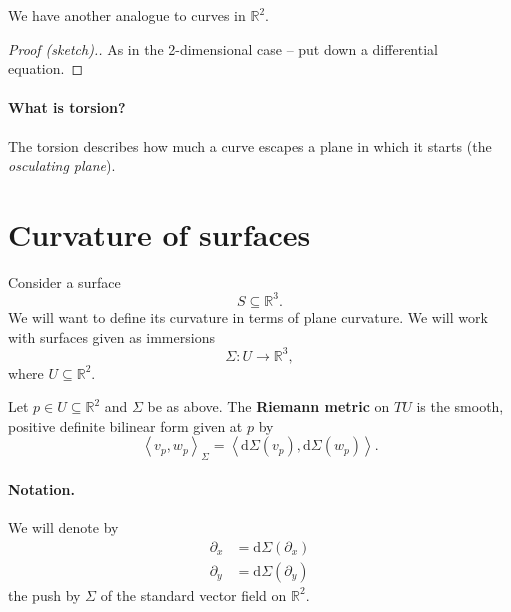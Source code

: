 We have another analogue to curves in \( \mathbb{R}^2 \).


\begin{proof}[Proof (sketch).]
As in the 2-dimensional case -- put down a differential equation.
\end{proof}

\paragraph{What is torsion?} The torsion describes how much a curve escapes a plane in which it starts (the \emph{osculating plane}).

\section{Curvature of surfaces}

Consider a surface 
\[ 
    S \subseteq \mathbb{R}^3.
\]
We will want to define its curvature in terms of plane curvature. We will work with surfaces given as immersions
\[ 
    \Sigma: U \to \mathbb{R}^3,
\]
where \( U \subseteq \mathbb{R}^2 \).

\begin{defn}
    Let \( p \in U \subseteq \mathbb{R}^2 \) and \( \Sigma \) be as above. The \textbf{Riemann metric} on \( TU \) is the smooth, positive definite bilinear form given at \( p \) by
    \[ 
        \left\langle v_p, w_p \right\rangle_\Sigma = \left\langle \mathrm{d}\Sigma(v_p), \mathrm{d}\Sigma(w_p) \right\rangle. 
   \]
\end{defn}

\paragraph{Notation.} We will denote by
\begin{align*}
    \partial_x &= \mathrm{d}\Sigma ( \partial_x ) \\
    \partial_y &= \mathrm{d}\Sigma ( \partial_y ) 
\end{align*}
the push by \( \Sigma \) of the standard vector field on \( \mathbb{R}^2 \).

